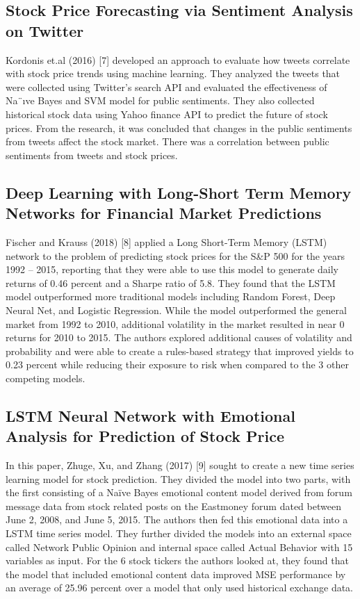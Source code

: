 \documentclass{llncs}
\begin{document}
\subsection{Stock  Price  Forecasting  via  Sentiment  Analysis  on  Twitter}

Kordonis et.al (2016) [7] developed an approach to evaluate how tweets correlate with stock price trends using machine learning. They analyzed the tweets that were collected using Twitter’s search API and evaluated the effectiveness of Na¨ıve Bayes and SVM model for public sentiments. They also collected historical stock data using Yahoo finance API to predict the future of stock prices. From the research, it was concluded that changes in the public sentiments from tweets affect the stock market. There was a correlation between public sentiments from tweets and stock prices.


\subsection{Deep Learning with Long-Short Term Memory Networks for Financial Market Predictions}

Fischer and Krauss (2018) [8] applied a Long Short-Term Memory (LSTM) network to the problem of predicting stock prices for the S&P 500 for the years 1992 – 2015, reporting that they were able to use this model to generate daily returns of 0.46 percent and a Sharpe ratio of 5.8. They found that the LSTM model outperformed more traditional models including Random Forest, Deep Neural Net, and Logistic Regression. While the model outperformed the general market from 1992 to 2010, additional volatility in the market resulted in near 0 returns for 2010 to 2015. The authors explored additional causes of volatility and probability and were able to create a rules-based strategy that improved yields to 0.23 percent while reducing their exposure to risk when compared to the 3 other competing models.

\subsection{LSTM Neural Network with Emotional Analysis for Prediction of Stock Price}

In this paper, Zhuge, Xu, and Zhang (2017) [9] sought to create a new time series learning model for stock prediction. They divided the model into two parts, with the first consisting of a Naïve Bayes emotional content model derived from forum message data from stock related posts on the Eastmoney forum dated between June 2, 2008, and June 5, 2015. The authors then fed this emotional data into a LSTM time series model. They further divided the models into an external space called Network Public Opinion and internal space called Actual Behavior with 15 variables as input. For the 6 stock tickers the authors looked at, they found that the model that included emotional content data improved MSE performance by an average of 25.96 percent over a model that only used historical exchange data.
\end{document}
